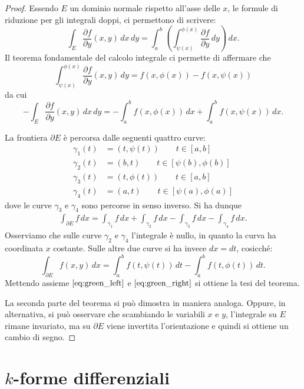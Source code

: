 \documentclass[italian,a4paper]{scrartcl}
\begin{document}
\begin{proof}
Essendo $E$ un dominio normale rispetto all'asse delle $x$, le formule
di riduzione per gli integrali doppi, ci permettono di scrivere:
\[
\int_E \frac{\partial f}{\partial y}(x,y)\, dx\, dy
= \int_a^b \left(\int_{\psi(x)}^{\phi(x)} \frac{\partial f}{\partial
  y}\, dy \right)\, dx.
\]
Il teorema fondamentale del calcolo integrale ci permette di affermare
che
\[
 \int_{\psi(x)}^{\phi(x)} \frac{\partial f}{\partial
  y}(x,y) \, dy = f(x,\phi(x)) - f(x,\psi(x))
\]
da cui
\begin{equation}\label{eq:green_left}
- \int_E \frac{\partial f}{\partial y}(x,y)\, dx\, dy
=
-\int_a^b f(x,\phi(x))\, dx + \int_a^b f(x,\psi(x))\, dx.
\end{equation}

La frontiera $\partial
E$ è percorsa dalle seguenti quattro curve:
\begin{align*}
\gamma_1(t) &= (t,\psi(t)) \qquad t\in[a,b]\\
\gamma_2(t) &= (b,t) \qquad t\in[\psi(b),\phi(b)]\\
\gamma_3(t) &= (t,\phi(t)) \qquad t\in[a,b]\\
\gamma_4(t) &= (a,t) \qquad t\in[\psi(a),\phi(a)]
\end{align*}
dove le curve $\gamma_3$ e $\gamma_4$ sono percorse in senso inverso.
Si ha dunque
\begin{align*}
\int_{\partial E} f\, dx
= \int_{\gamma_1} f\, dx
 + \int_{\gamma_2} f\, dx
 - \int_{\gamma_3} f\, dx
 - \int_{\gamma_4} f\, dx.
\end{align*}
Osserviamo che sulle curve $\gamma_2$ e $\gamma_4$ l'integrale è
nullo, in quanto la curva ha coordinata $x$ costante. Sulle altre due
curve si ha invece $dx = dt$, cosicché:
\begin{equation}\label{eq:green_right}
\int_{\partial E} f(x,y)\, dx
= \int_a^b f(t,\psi(t))\, dt - \int_a^b f(t,\phi(t))\, dt.
\end{equation}
Mettendo assieme $\eqref{eq:green_left}$ e $\eqref{eq:green_right}$ si
ottiene la tesi del teorema.

La seconda parte del teorema si può dimostra in maniera analoga. Oppure, in
alternativa, si può osservare che scambiando le variabili $x$ e $y$,
l'integrale su $E$ rimane invariato, ma su $\partial E$ viene
invertita l'orientazione e quindi si ottiene un cambio di segno.
\end{proof}

\section{$k$-forme differenziali}
\end{document}
